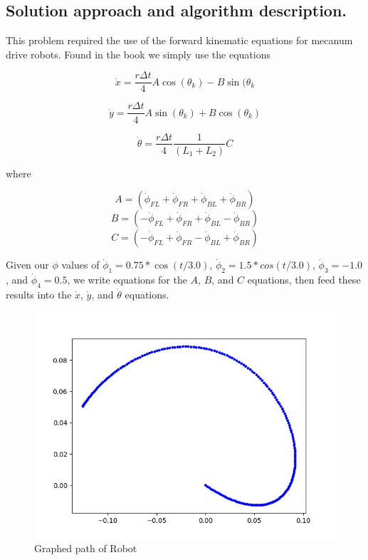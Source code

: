 \documentclass[letterpaper,11pt]{texMemo} %
\begin{document}
\subsection*{Solution approach and algorithm description.}
This problem required the use of the forward kinematic equations for mecanum drive robots.
Found in the book we simply use the equations

\[
    \dot{x}=\frac{r\Delta t}{4} A\cos(\theta_{k})  - B \sin(\theta_{k}
\]

\[
    \dot{y}=\frac{r\Delta t}{4} A\sin(\theta_{k})  + B \cos(\theta_{k})
\]

\[
    \dot{\theta}= \frac{r\Delta t}{4} \frac{1}{(L_1+L_2) } C
\]

where

\[A = \left(\dot{\phi}_{FL} + \dot{\phi}_{FR} + \dot{\phi}_{BL} + \dot{\phi}_{BR}\right)\]
\[B = \left( -\dot{\phi}_{FL} + \dot{\phi}_{FR} + \dot{\phi}_{BL} - \dot{\phi}_{BR}\right)\]
\[C = \left( -\dot{\phi}_{FL} + \dot{\phi}_{FR} - \dot{\phi}_{BL} +\dot{\phi}_{BR} \right)\]

Given our $\phi$ values of $\dot{\phi}_1 = 0.75*\cos(t/3.0)$, $\dot{\phi}_2 = 1.5*cos(t/3.0)$,
 $\dot{\phi}_3 = -1.0$, and $\dot{\phi}_4 = 0.5$, we write equations for the $A$, $B$, and $C$ equations,
 then feed these results into the $\dot{x}$, $\dot{y}$, and $\dot{\theta}$ equations.

\begin{figure}[ht]
\caption{Graphed path of Robot}
\centering
\includegraphics[scale=0.45]{img/P4a.png}
\end{figure}
\end{document}
